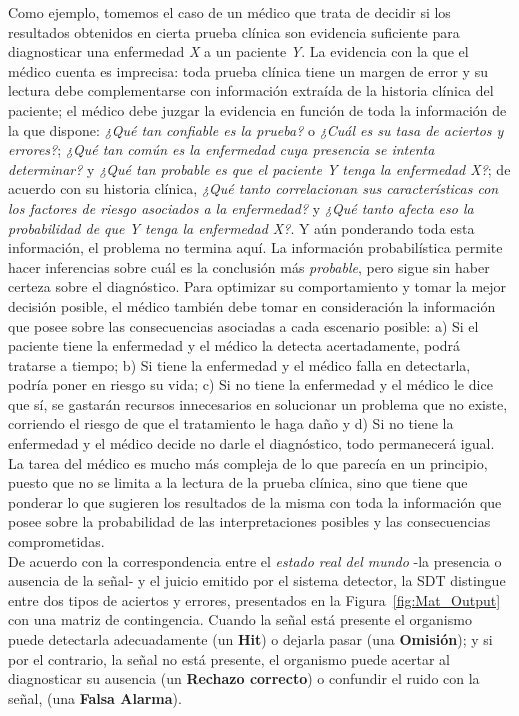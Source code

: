 Como ejemplo, tomemos el caso de un médico que trata de decidir si los resultados obtenidos en cierta prueba clínica son evidencia suficiente para diagnosticar una enfermedad \textit{X} a un paciente \textit{Y}. La evidencia con la que el médico cuenta es imprecisa: toda prueba clínica tiene un margen de error y su lectura debe complementarse con información extraída de la historia clínica del paciente; el médico debe juzgar la evidencia en función de toda la información de la que dispone: \textit{¿Qué tan confiable es la prueba?} o \textit{¿Cuál es su tasa de aciertos y errores?}; \textit{¿Qué tan común es la enfermedad cuya presencia se intenta determinar?} y \textit{¿Qué tan probable es que el paciente Y tenga la enfermedad X?}; de acuerdo con su historia clínica, \textit{¿Qué tanto correlacionan sus características con los factores de riesgo asociados a la enfermedad?} y \textit{¿Qué tanto afecta eso la probabilidad de que Y tenga la enfermedad X?}. Y aún ponderando toda esta información, el problema no termina aquí. La información probabilística permite hacer inferencias sobre cuál es la conclusión más \textit{probable}, pero sigue sin haber certeza sobre el diagnóstico. Para optimizar su comportamiento y tomar la mejor decisión posible, el médico también debe tomar en consideración la información que posee sobre las consecuencias asociadas a cada escenario posible: a) Si el paciente tiene la enfermedad y el médico la detecta acertadamente, podrá tratarse a tiempo; b) Si tiene la enfermedad y el médico falla en detectarla, podría poner en riesgo su vida; c) Si no tiene la enfermedad y el médico le dice que sí, se gastarán recursos innecesarios en solucionar un problema que no existe, corriendo el riesgo de que el tratamiento le haga daño y d) Si no tiene la enfermedad y el médico decide no darle el diagnóstico, todo permanecerá igual. La tarea del médico es mucho más compleja de lo que parecía en un principio, puesto que no se limita a la lectura de la prueba clínica, sino que tiene que ponderar lo que sugieren los resultados de la misma con toda la información que posee sobre la probabilidad de las interpretaciones posibles y las consecuencias comprometidas.\\

De acuerdo con la correspondencia entre el \textit{estado real del mundo} -la presencia o ausencia de la señal- y el juicio emitido por el sistema detector, la SDT distingue entre dos tipos de aciertos y errores, presentados en la Figura~\ref{fig:Mat_Output} con una matriz de contingencia. Cuando la señal está presente el organismo puede detectarla adecuadamente (un \textbf{Hit}) o dejarla pasar (una \textbf{Omisión}); y si por el contrario, la señal no está presente, el organismo puede acertar al diagnosticar su ausencia (un \textbf{Rechazo correcto}) o confundir el ruido con la señal, (una \textbf{Falsa Alarma}).\\

